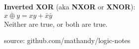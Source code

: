 \documentclass{article}
\begin{document}
\noindent \textbf{Inverted XOR} (aka \textbf{NXOR} or \textbf{XNOR}):\\
$\overline{x \oplus y} = xy + \bar{x}\bar{y}$\\
{\large Neither are true, or both are true.}


\hfill {\color{gray}\normalsize source:  github.com/mathandy/logic-notes}
\end{document}
